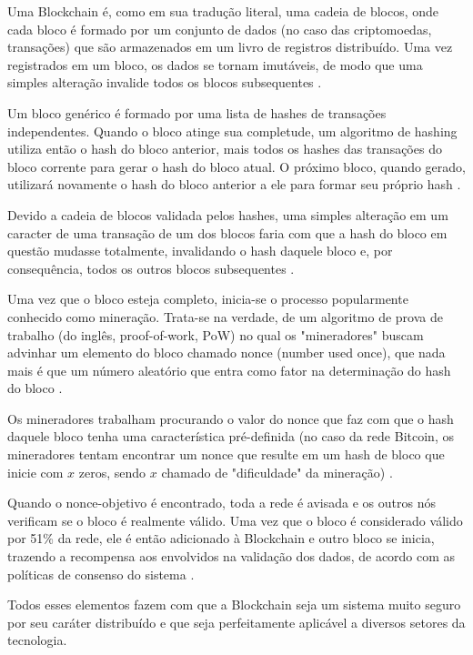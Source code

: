 \documentclass[openright]{normas-utf-tex} %
\begin{document}
Uma Blockchain é, como em sua tradução literal, uma cadeia de blocos, onde cada bloco é formado por um conjunto de dados (no caso das criptomoedas, transações) que são armazenados em um livro de registros distribuído. Uma vez registrados em um bloco, os dados se tornam imutáveis, de modo que uma simples alteração invalide todos os blocos subsequentes \cite{Tasatanattakool2018}.

Um bloco genérico é formado por uma lista de hashes de transações independentes. Quando o bloco atinge sua completude, um algoritmo de hashing utiliza então o hash do bloco anterior, mais todos os hashes das transações do bloco corrente para gerar o hash do bloco atual. O próximo bloco, quando gerado, utilizará novamente o hash do bloco anterior a ele para formar seu próprio hash \cite{Nakamoto2008}.

Devido a cadeia de blocos validada pelos hashes, uma simples alteração em um caracter de uma transação de um dos blocos faria com que a hash do bloco em questão mudasse totalmente, invalidando o hash daquele bloco e, por consequência, todos os outros blocos subsequentes \cite{Iansiti2017}.

Uma vez que o bloco esteja completo, inicia-se o processo popularmente conhecido como mineração. Trata-se na verdade, de um algoritmo de prova de trabalho (do inglês, proof-of-work, PoW) no qual os "mineradores" buscam advinhar um elemento do bloco chamado nonce (number used once), que nada mais é que um número aleatório que entra como fator na determinação do hash do bloco \cite{Nakamoto2008}.

Os mineradores trabalham procurando o valor do nonce que faz com que o hash daquele bloco tenha uma característica pré-definida (no caso da rede Bitcoin, os mineradores tentam encontrar um nonce que resulte em um hash de bloco que inicie com $x$ zeros, sendo $x$ chamado de "dificuldade" da mineração) \cite{Vujicic2018}.

Quando o nonce-objetivo é encontrado, toda a rede é avisada e os outros nós verificam se o bloco é realmente válido. Uma vez que o bloco é considerado válido por 51\% da rede, ele é então adicionado à Blockchain e outro bloco se inicia, trazendo a recompensa aos envolvidos na validação dos dados, de acordo com as políticas de consenso do sistema \cite{Judmayer2017}.

Todos esses elementos fazem com que a Blockchain seja um sistema muito seguro por seu caráter distribuído e que seja perfeitamente aplicável a diversos setores da tecnologia.
\end{document}
